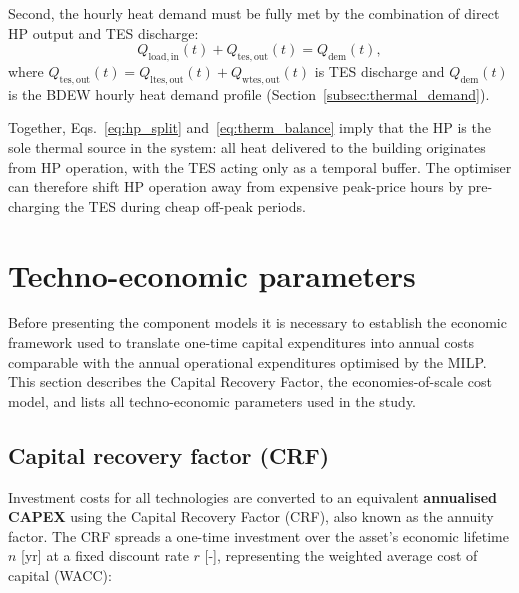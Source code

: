 \documentclass[11pt,a4paper]{report}
\begin{document}
Second, the hourly heat demand must be fully met by the combination of direct HP
output and TES discharge:
\begin{equation}
    Q_\mathrm{load,in}(t) + Q_\mathrm{tes,out}(t) = Q_\mathrm{dem}(t),
    \label{eq:therm_balance}
\end{equation}
where $Q_\mathrm{tes,out}(t) = Q_\mathrm{ltes,out}(t) + Q_\mathrm{wtes,out}(t)$
is TES discharge and $Q_\mathrm{dem}(t)$ is the BDEW hourly heat demand profile
(Section~\ref{subsec:thermal_demand}).

Together, Eqs.~\eqref{eq:hp_split} and~\eqref{eq:therm_balance} imply that the
HP is the sole thermal source in the system: all heat delivered to the building
originates from HP operation, with the TES acting only as a temporal buffer.
The optimiser can therefore shift HP operation away from expensive peak-price
hours by pre-charging the TES during cheap off-peak periods.







\section{Techno-economic parameters}
\label{sec:econ_params}

Before presenting the component models it is necessary to establish the economic framework
used to translate one-time capital expenditures into annual costs comparable with the
annual operational expenditures optimised by the MILP.
This section describes the Capital Recovery Factor, the economies-of-scale cost model,
and lists all techno-economic parameters used in the study.

\subsection{Capital recovery factor (CRF)}
\label{sub:crf}

Investment costs for all technologies are converted to an equivalent \textbf{annualised
CAPEX} using the Capital Recovery Factor (CRF), also known as the annuity factor.
The CRF spreads a one-time investment over the asset's economic lifetime $n$ [yr]
at a fixed discount rate $r$ [-], representing the weighted average cost of capital (WACC):
\end{document}
